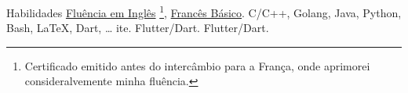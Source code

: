
\begin{rubric}{Habilidades}
\entry*[Línguas]
    \href{https://drive.google.com/file/d/1PTySqO2pdP8BjxMf1Vgrz0EzpBxw9jYq/view?usp=sharing}{Fluência em Inglês}
    \footnote{Certificado emitido antes do intercâmbio para a França, onde aprimorei consideralvemente minha fluência.},
    \href{https://drive.google.com/file/d/1yjeEiOAcLmwbUxXELqplRyCWaUSi7e8C/view?usp=sharing}{Francês Básico}.
    C/C++, Golang, Java, Python, Bash, \LaTeX, Dart, \ldots
{}%
    ite.
\entry*[Web]
    Flutter/Dart.
    Flutter/Dart.
\end{rubric}
